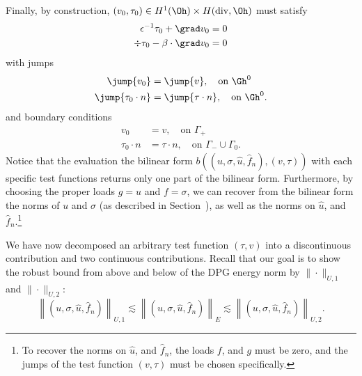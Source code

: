 Finally, by construction, $\left(v_0,\tau_0\right) \in H^1(\Oh) \times H({\rm div},\Oh)$ must satisfy 
\begin{align*}
\epsilon^{-1}\tau_0 + \grad v_0 &= 0\\
\div \tau_0 - \beta\cdot \grad v_0 &= 0
\end{align*}
with jumps
\begin{align*}
\jump{v_0} &= \jump{v}, \quad \text{on }\Gh^0\\
\jump{\tau_0 \cdot n} &= \jump{\tau \cdot n}, \quad \text{on }\Gh^0.
\end{align*}
and boundary conditions
\begin{align*}
v_0 &= v, \quad \text{on } \Gamma_+ \\
\tau_0 \cdot n &= \tau \cdot n, \quad \text{on } \Gamma_-\cup \Gamma_0. 
\end{align*}
Notice that the evaluation the bilinear form $b\left(\left(u,\sigma,\widehat{u},\widehat{f}_n\right),\left(v,\tau\right)\right)$ with each specific test functions returns only one part of the bilinear form. Furthermore, by choosing the proper loads $g = u$ and $f=\sigma$, we can recover from the bilinear form the norms of $u$ and $\sigma$ (as described in Section~), as well as the norms on $\widehat{u}$, and $\widehat{f}_n$.\footnote{To recover the norms on $\widehat{u}$, and $\widehat{f}_n$, the loads $f$, and $g$ must be zero, and the jumps of the test function $(v,\tau)$ must be chosen specifically.}

We have now decomposed an arbitrary test function $\left(\tau,v\right)$ into a discontinuous contribution and two continuous contributions.  Recall that our goal is to show the robust bound from above and below of the DPG energy norm by $\|\cdot \|_{U,1}$ and $\|\cdot \|_{U,2}$:
\[
\left\| \left(u,\sigma,\widehat{u},\widehat{f}_n\right)\right \|_{U,1} \lesssim  \left\| \left(u,\sigma,\widehat{u},\widehat{f}_n\right)\right \|_E \lesssim \left\| \left(u,\sigma,\widehat{u},\widehat{f}_n\right)\right \|_{U,2}.
\]

